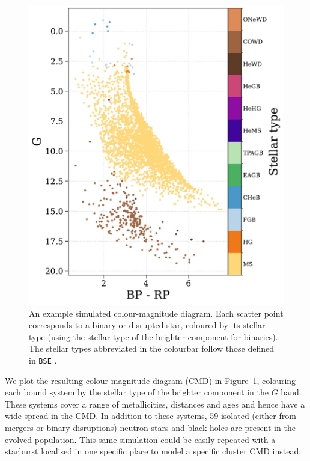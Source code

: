 \documentclass[twocolumn, twocolappendix, oneside]{aastex631}
\begin{document}
\begin{figure}
    \centering
    \includegraphics[width=\columnwidth]{figures/gaia-cmd.pdf}
    \caption{An example simulated \gaia colour-magnitude diagram. Each scatter point corresponds to a binary or disrupted star, coloured by its stellar type (using the stellar type of the brighter component for binaries). The stellar types abbreviated in the colourbar follow those defined in \texttt{BSE} \citep[see Section 4 of][]{Hurley+2000:2000MNRAS.315..543H}.}
    \label{fig:gaia-cmd}
\end{figure}

We plot the resulting colour-magnitude diagram (CMD) in Figure~\ref{fig:gaia-cmd}, colouring each bound system by the stellar type of the brighter component in the $G$ band. These systems cover a range of metallicities, distances and ages and hence have a wide spread in the CMD. In addition to these systems, 59 isolated (either from mergers or binary disruptions) neutron stars and black holes are present in the evolved population. This same simulation could be easily repeated with a starburst localised in one specific place to model a specific cluster CMD instead.
\end{document}
